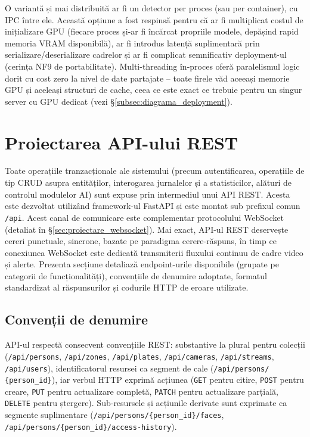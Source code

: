 \documentclass[../../main.tex]{subfiles}
\begin{document}
O variantă și mai distribuită ar fi un detector per proces (sau per container), cu IPC între ele. Această opțiune a fost respinsă pentru că ar fi multiplicat costul de inițializare GPU (fiecare proces și-ar fi încărcat propriile modele, depășind rapid memoria VRAM disponibilă), ar fi introdus latență suplimentară prin serializare/deserializare cadrelor și ar fi complicat semnificativ deployment-ul (cerința NF9 de portabilitate). Multi-threading în-proces oferă paralelismul logic dorit cu cost zero la nivel de date partajate -- toate firele văd aceeași memorie GPU și aceleași structuri de cache, ceea ce este exact ce trebuie pentru un singur server cu GPU dedicat (vezi \S\ref{subsec:diagrama_deployment}).

\section{Proiectarea API-ului REST}
\label{sec:api_rest}

Toate operațiile tranzacționale ale sistemului (precum autentificarea, operațiile de tip CRUD asupra entităților, interogarea jurnalelor și a statisticilor, alături de controlul modulelor AI) sunt expuse prin intermediul unui API REST. Acesta este dezvoltat utilizând framework-ul FastAPI și este montat sub prefixul comun \texttt{/api}. Acest canal de comunicare este complementar protocolului WebSocket (detaliat în \S\ref{sec:proiectare_websocket}). Mai exact, API-ul REST deservește cereri punctuale, sincrone, bazate pe paradigma cerere-răspuns, în timp ce conexiunea WebSocket este dedicată transmiterii fluxului continuu de cadre video și alerte. Prezenta secțiune detaliază endpoint-urile disponibile (grupate pe categorii de funcționalități), convențiile de denumire adoptate, formatul standardizat al răspunsurilor și codurile HTTP de eroare utilizate.

\subsection{Convenții de denumire}

API-ul respectă consecvent convențiile REST: substantive la plural pentru colecții (\texttt{/api/persons}, \texttt{/api/zones}, \texttt{/api/plates}, \texttt{/api/cameras}, \texttt{/api/streams}, \texttt{/api/users}), identificatorul resursei ca segment de cale (\texttt{/api/persons/ \linebreak \{person\_id\}}), iar verbul HTTP exprimă acțiunea (\texttt{GET} pentru citire, \texttt{POST} pentru creare, \texttt{PUT} pentru actualizare completă, \texttt{PATCH} pentru actualizare parțială, \texttt{DELETE} pentru ștergere). Sub-resursele și acțiunile derivate sunt exprimate ca segmente suplimentare (\texttt{/api/persons/\{person\_id\}/faces}, \texttt{/api/persons/\linebreak \{person\_id\}/access-history}).
\end{document}
